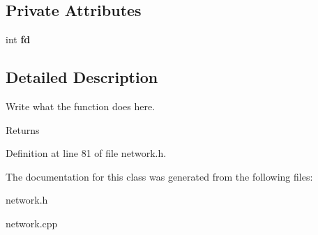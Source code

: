 \subsection*{Private Attributes}
\begin{DoxyCompactItemize}
\item 
\hypertarget{classNetworkServer_a3a4cbba07f7c425a9147f8a21b714e7f}{int {\bfseries fd}}\label{classNetworkServer_a3a4cbba07f7c425a9147f8a21b714e7f}

\end{DoxyCompactItemize}


\subsection{Detailed Description}
Write what the function does here. 

\begin{DoxyReturn}{Returns}

\end{DoxyReturn}


Definition at line 81 of file network.\+h.



The documentation for this class was generated from the following files\+:\begin{DoxyCompactItemize}
\item 
network.\+h\item 
network.\+cpp\end{DoxyCompactItemize}
